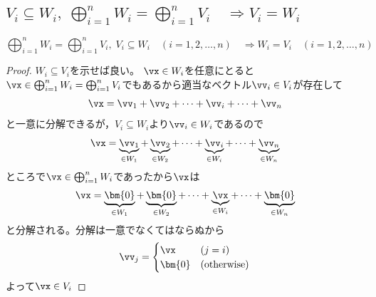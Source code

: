         \subsection{\texorpdfstring{$V_i \subseteq W_i,\;\bigoplus_{i=1}^n {W_i} = \bigoplus_{i=1}^n {V_i}\quad\Rightarrow V_i=W_i$}{Vi⊆Wi, V1⊕...⊕Vn = W1⊕...⊕Wn ⇒ Vi=Wi}}
            \begin{shadebox}
                \[\bigoplus_{i=1}^n{W_i}=\bigoplus_{i=1}^n{V_i},\;V_i \subseteq W_i\quad(i=1,2,\dotsc,n)\quad\Rightarrow W_i=V_i\quad(i=1,2,\dotsc,n)\]
            \end{shadebox}
            \begin{proof}
                \quad\par
                $W_i\subseteq V_i$を示せば良い。
                $\vx\in W_i$を任意にとると$\vx\in \bigoplus_{i=1}^n{W_i}=\bigoplus_{i=1}^n{V_i}$でもあるから適当なベクトル$\vv_i\in V_i$が存在して
                \[\vx = \vv_1+\vv_2+\dotsb+\vv_i+\dotsb+\vv_n\]
                と一意に分解できるが，$V_i\subseteq W_i$より$\vv_i\in W_i$であるので
                \[\vx = \underbrace{\vv_1}_{\in W_1}+\underbrace{\vv_2}_{\in W_2}+\dotsb+\underbrace{\vv_i}_{\in W_i}+\dotsb+\underbrace{\vv_n}_{\in W_n}\]
                ところで$\vx\in \bigoplus_{i=1}^n{W_i}$であったから$\vx$は
                \[\vx = \underbrace{\bm{0}}_{\in W_1}+\underbrace{\bm{0}}_{\in W_2}+\dotsb+\underbrace{\vx}_{\in W_i}+\dotsb+\underbrace{\bm{0}}_{\in W_n}\]
                と分解される。分解は一意でなくてはならぬから
                \begin{equation*}
                    \vv_j =
                    \begin{cases}
                        \vx & (j=i)\\
                        \bm{0} & (\mathrm{otherwise})
                    \end{cases}
                \end{equation*}
                よって$\vx\in V_i$
            \end{proof}
